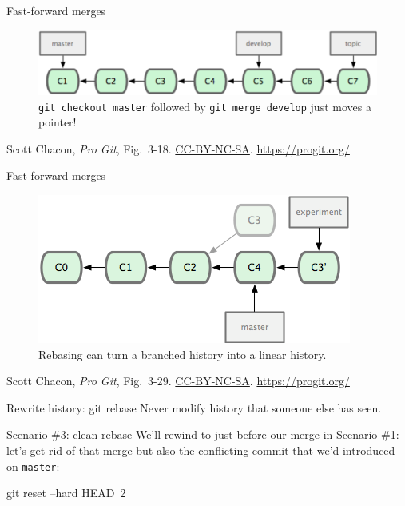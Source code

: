\begin{frame}{Fast-forward merges}
  \begin{figure}
    \includegraphics[scale=0.8]{18333fig0318-tn.png}
    \\ \texttt{git checkout master} followed by \texttt{git merge develop}
    just moves a pointer!
  \end{figure}
  \footnotesize{Scott Chacon,
    \emph{Pro Git},
    Fig.~3-18.
    \href{https://creativecommons.org/licenses/by-nc-sa/3.0/legalcode}{CC-BY-NC-SA}.
    \href{https://progit.org/}{https://progit.org/}}
\end{frame}

\begin{frame}{Fast-forward merges}
  \begin{figure}
    \includegraphics[scale=0.8]{18333fig0329-tn.png}
    \\ Rebasing can turn a branched history into a linear history.
  \end{figure}
  \footnotesize{Scott Chacon,
    \emph{Pro Git},
    Fig.~3-29.
    \href{https://creativecommons.org/licenses/by-nc-sa/3.0/legalcode}{CC-BY-NC-SA}.
    \href{https://progit.org/}{https://progit.org/}}
\end{frame}

\begin{frame}{Rewrite history: git rebase}
  \huge {
  Never modify history that someone else has seen.
  }
\end{frame}

\begin{frame}[fragile]{Scenario \#3: clean rebase}
  We'll rewind to just before our merge in Scenario \#1: let's get rid
  of that merge but also the conflicting commit that we'd introduced
  on \texttt{master}:

  \begin{gitCommand}git reset --hard HEAD~2\end{gitCommand}
\end{frame}


